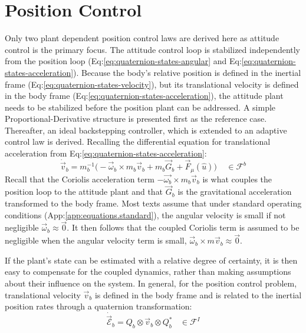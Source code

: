\section{Position Control}
\label{sec:control.position}
Only two plant dependent position control laws are derived here as attitude control is the primary focus. The attitude control loop is stabilized independently from the position loop (Eq:\ref{eq:quaternion-states-angular} and Eq:\ref{eq:quaternion-states-acceleration}). Because the body's relative position is defined in the inertial frame (Eq:\ref{eq:quaternion-states-velocity}), but its translational velocity is defined in the body frame (Eq:\ref{eq:quaternion-states-acceleration}), the attitude plant needs to be stabilized before the position plant can be addressed. A simple Proportional-Derivative structure is presented first as the reference case. Thereafter, an ideal backstepping controller, which is extended to an adaptive control law is derived. Recalling the differential equation for translational acceleration from Eq:\ref{eq:quaternion-states-acceleration}:
\begin{equation}\label{eq:position-deriv}
\dot{\vec{v}}_b=m_b^{-1}\big(-\vec{\omega}_b\times m_b\vec{v}_b+m_b\vec{G}_b+\vec{F}_\mu(\hat{u})\big)~~~~~\in\mathcal{F}^b
\end{equation}
Recall that the Coriolis acceleration term $-\vec{\omega_b}\times m_b\vec{v}_b$ is what couples the position loop to the attitude plant and that $\vec{G}_b$ is the gravitational acceleration transformed to the body frame. Most texts assume that under standard operating conditions (App:\ref{app:equations.standard}), the angular velocity is small if not negligible $\vec{\omega}_b\approx\vec{0}$. It then follows that the coupled Coriolis term is assumed to be negligible when the angular velocity term is small, $\vec{\omega}_b\times m\vec{v}_b\approx \vec{0}$. 
\par
If the plant's state can be estimated with a relative degree of certainty, it is then easy to compensate for the coupled dynamics, rather than making assumptions about their influence on the system. In general, for the position control problem, translational velocity $\vec{v}_b$ is defined in the body frame and is related to the inertial position rates through a quaternion transformation:
\begin{equation}
\dot{\vec{\mathcal{E}}}_b=Q_b\otimes\vec{v}_b\otimes Q_b^*~~~~\in\mathcal{F}^I
\end{equation}
